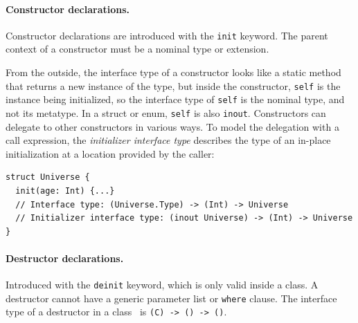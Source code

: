 \documentclass[../generics]{subfiles}
\begin{document}
\paragraph{Constructor declarations.}
Constructor declarations are introduced with the \texttt{init} keyword. The parent context of a constructor must be a nominal type or extension.

From the outside, the interface type of a constructor looks like a static method that returns a new instance of the type, but inside the constructor, \texttt{self} is the instance being initialized, so the interface type of \texttt{self} is the nominal type, and not its metatype. In a struct or enum, \texttt{self} is also \texttt{inout}. Constructors can delegate to other constructors in various ways. To model the delegation with a call expression, the \emph{initializer interface type} describes the type of an in-place initialization at a location provided by the caller:
\begin{Verbatim}
struct Universe {
  init(age: Int) {...}
  // Interface type: (Universe.Type) -> (Int) -> Universe
  // Initializer interface type: (inout Universe) -> (Int) -> Universe
}
\end{Verbatim}

\paragraph{Destructor declarations.}
Introduced with the \texttt{deinit} keyword, which is only valid inside a class. A destructor cannot have a generic parameter list or \texttt{where} clause. The interface type of a destructor in a class \tC\ is \texttt{(C) -> () -> ()}.
\end{document}
